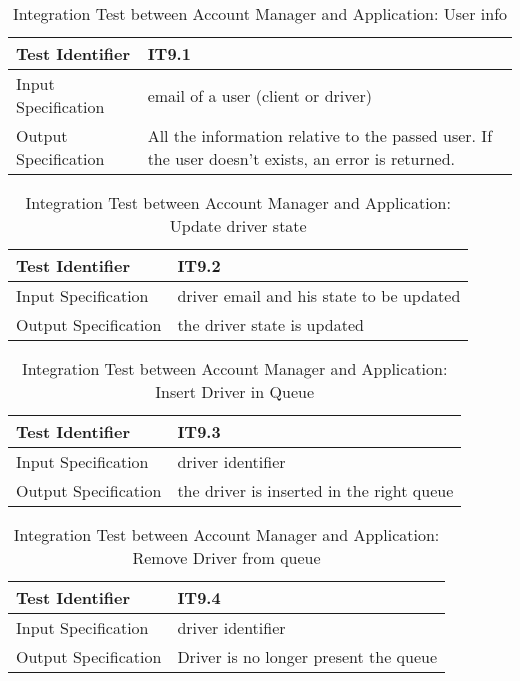 \documentclass[a4paper]{article}
\begin{document}
\begin{table} [H]
\begin{center}
\begin{tabular}{| L | p{\rightcol} |}
  \hline
  Test Identifier & IT9.1 \\
  \hline
  Input Specification & email of a user (client or driver)\\
  \hline
  Output Specification & All the information relative to the passed user. If the user doesn't exists, an error is returned.\\
  \hline
\end{tabular}
\end{center}
\caption{Integration Test between Account Manager and Application: User info}
\end{table}

\begin{table} [H]
\begin{center}
\begin{tabular}{| L | p{\rightcol} |}
  \hline
  Test Identifier & IT9.2 \\
  \hline
  Input Specification & driver email and his state to be updated\\
  \hline
  Output Specification & the driver state is updated\\
  \hline
\end{tabular}
\end{center}
\caption{Integration Test between Account Manager and Application: Update driver state}
\end{table}

\begin{table} [H]
\begin{center}
\begin{tabular}{| L | p{\rightcol} |}
  \hline
  Test Identifier & IT9.3 \\
  \hline
  Input Specification & driver identifier\\
  \hline
  Output Specification & the driver is inserted in the right queue\\
  \hline
\end{tabular}
\end{center}
\caption{Integration Test between Account Manager and Application: Insert Driver in Queue}
\end{table}

\begin{table} [H]
\begin{center}
\begin{tabular}{| L | p{\rightcol} |}
  \hline
  Test Identifier & IT9.4 \\
  \hline
  Input Specification & driver identifier\\
  \hline
  Output Specification & Driver is no longer present the queue\\
  \hline
\end{tabular}
\end{center}
\caption{Integration Test between Account Manager and Application: Remove Driver from queue}
\end{table}
\end{document}
